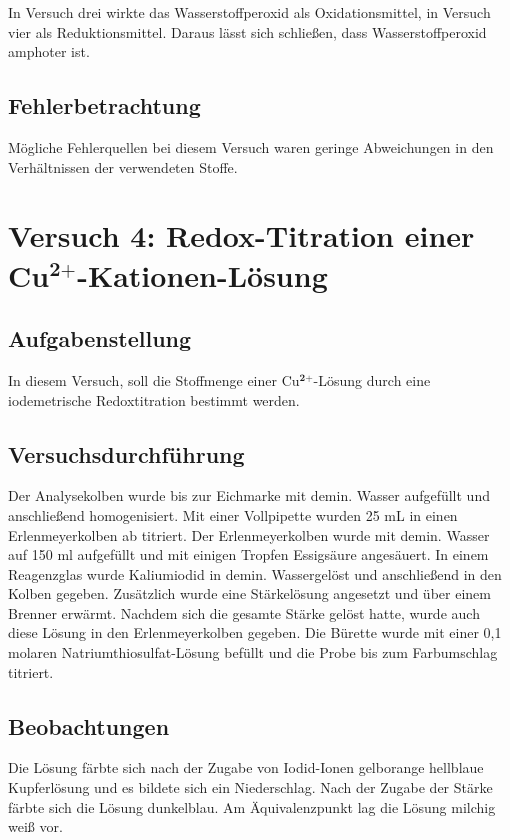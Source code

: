 \documentclass[12pt]{scrartcl} %
\begin{document}
\newpage


In Versuch drei wirkte das Wasserstoffperoxid als Oxidationsmittel, in Versuch vier als Reduktionsmittel. Daraus lässt sich schließen, dass Wasserstoffperoxid amphoter ist.



\subsection{Fehlerbetrachtung}
Mögliche Fehlerquellen bei diesem Versuch waren geringe Abweichungen in den Verhältnissen der verwendeten Stoffe.



\section{Versuch 4: Redox-Titration einer Cu$^{\textbf{2+}}$-Kationen-Lösung}

\subsection{Aufgabenstellung}
In diesem Versuch, soll die Stoffmenge einer Cu$^{\textbf{2+}}$-Lösung durch eine iodemetrische Redoxtitration bestimmt werden.


\subsection{Versuchsdurchführung}
Der Analysekolben wurde bis zur Eichmarke mit demin. Wasser aufgefüllt und anschließend homogenisiert. Mit einer Vollpipette wurden 25 mL in einen Erlenmeyerkolben ab titriert. Der Erlenmeyerkolben wurde mit demin. Wasser auf 150 ml aufgefüllt und mit einigen Tropfen Essigsäure angesäuert. In einem Reagenzglas wurde Kaliumiodid in demin. Wassergelöst und anschließend in den Kolben gegeben. Zusätzlich wurde eine Stärkelösung angesetzt und über einem Brenner erwärmt. Nachdem sich die gesamte Stärke gelöst hatte, wurde auch diese Lösung in den Erlenmeyerkolben gegeben. Die Bürette wurde mit einer 0,1 molaren  Natriumthiosulfat-Lösung befüllt und die Probe bis zum Farbumschlag titriert.   


\subsection{Beobachtungen}
Die Lösung färbte sich nach der Zugabe von Iodid-Ionen gelborange hellblaue Kupferlösung  und es bildete sich ein Niederschlag. Nach der Zugabe der Stärke färbte sich die Lösung dunkelblau. Am Äquivalenzpunkt lag die Lösung milchig weiß vor.
\end{document}
